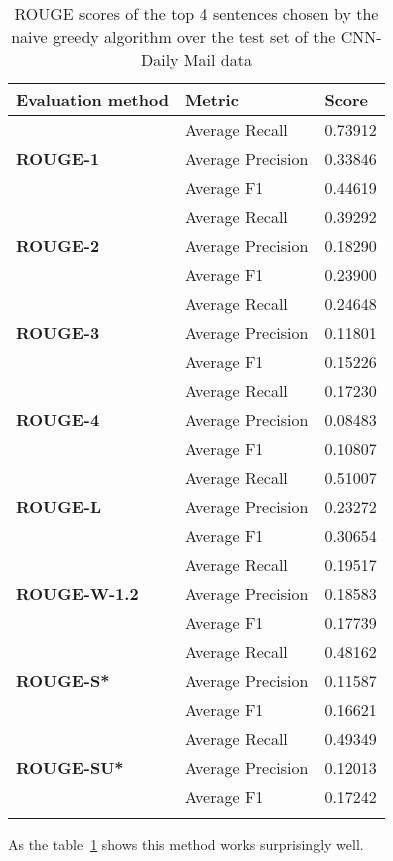 {

\begin{longtable}{| l | l | l |}
	\hline
	\textbf{Evaluation method}&\textbf{Metric}&\textbf{Score}\\ \hline \hline
		\multirow{3}{*}{\textbf{ROUGE-1}}
			&Average Recall&0.73912\\
			&Average Precision&0.33846 \\
			&Average F1&0.44619 \\ \hline \hline
		\multirow{3}{*}{\textbf{ROUGE-2}}
			&Average Recall&0.39292 \\
			&Average Precision&0.18290 \\
			&Average F1&0.23900 \\ \hline \hline
		\multirow{3}{*}{\textbf{ROUGE-3}}
			&Average Recall&0.24648 \\
			&Average Precision&0.11801 \\
			&Average F1&0.15226 \\ \hline \hline
		\multirow{3}{*}{\textbf{ROUGE-4}}
			&Average Recall&0.17230 \\
			&Average Precision&0.08483 \\
			&Average F1&0.10807 \\ \hline \hline
		\multirow{3}{*}{\textbf{ROUGE-L}}
			&Average Recall&0.51007 \\
			&Average Precision&0.23272 \\
			&Average F1&0.30654 \\ \hline \hline
		\multirow{3}{*}{\textbf{ROUGE-W-1.2}}
			&Average Recall&0.19517 \\
			&Average Precision&0.18583 \\
			&Average F1&0.17739 \\ \hline \hline
		\multirow{3}{*}{\textbf{ROUGE-S*}}
			&Average Recall&0.48162 \\
			&Average Precision&0.11587 \\
			&Average F1&0.16621 \\ \hline \hline
		\multirow{3}{*}{\textbf{ROUGE-SU*}}
			&Average Recall&0.49349 \\
			&Average Precision&0.12013 \\
			&Average F1&0.17242 \\ \hline
		\caption{ROUGE scores of the top 4 sentences chosen by the naive greedy algorithm over the test set of the CNN-Daily Mail data}
		\label{tab:extr}
\end{longtable}
As the table~\ref{tab:extr} shows this method works surprisingly well.

}
